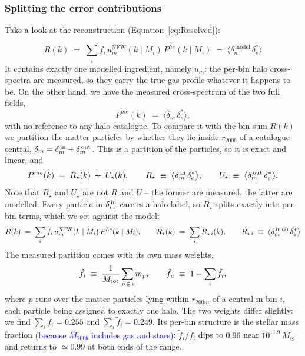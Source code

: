 \documentclass{article}
\begin{document}
\subsubsection{Splitting the error contributions}


Take a look at the reconstruction (Equation~\ref{eq:Resolved}):

\begin{equation}
    R(k) \; = \; \sum_i f_i \, u_m^\mathrm{NFW}(k \mid M_i) \, P^{he}(k \mid M_i) \; = \; \langle \delta_m^\mathrm{\,model} \, \delta_e^*\rangle
\end{equation}
It contains exactly one modelled ingredient, namely $u_m$: the per-bin halo cross-spectra are measured, so
they carry the true gas profile whatever it happens to be. On the other hand, we have the measured cross-spectrum of the two full fields,
\begin{equation}
  P^{me}(k) \;=\; \big\langle \delta_m\, \delta_e^* \big\rangle ,
\end{equation}
with no reference to any halo catalogue. To compare it with the bin sum
$R(k)$ we partition the matter
particles by whether they lie inside $r_{200b}$ of a catalogue central,
$\delta_m = \delta_m^{\,\rm in} + \delta_m^{\,\rm out}$. This is a partition of the
particles, so it is exact and linear, and
\begin{equation}
  P^{me}(k) \;=\; R_\star(k) \;+\; U_\star(k), \qquad
  R_\star \;\equiv\; \big\langle \delta_m^{\,\rm in} \, \delta_e^* \big\rangle, \qquad
  U_\star \;\equiv\; \big\langle \delta_m^{\,\rm out} \, \delta_e^* \big\rangle .
  \label{eq:T_split}
\end{equation}
Note that $R_\star$ and $U_\star$ are not $R$ and $U$ -- the former are measured, the latter are modelled. Every particle in $\delta_m^{\,\rm in}$ carries a halo label, so $R_\star$ splits exactly into per-bin terms, which we set against the model:
\begin{equation} \label{R_Rstar}
R(k) \; = \; \sum_i f_i \, u_m^\mathrm{NFW}(k \mid M_i) \, P^{he}(k \mid M_i), \qquad R_\star(k) \; = \; \sum_i R_{\star\,i}(k), \qquad R_{\star\,i} \;\equiv\; \big\langle \delta_m^{\,{\rm in}\,(i)} \, \delta_e^* \big\rangle
\end{equation}
The measured partition comes with its own mass weights,
\begin{equation}
    \tilde f_i \;\equiv\; \frac{1}{M_{\rm tot}}\sum_{p\,\in\,i} m_p,
  \qquad
  \tilde f_u \;\equiv\; 1-\sum_i \tilde f_i,
  \label{eq:ftilde}
\end{equation}
where $p$ runs over the matter particles lying within $r_{200m}$ of a central
in bin $i$, each particle being assigned to exactly one halo. The two weights
differ slightly: we find
$\sum_i f_i = 0.255$ and $\sum_i \tilde f_i = 0.249$. Its per-bin
structure is the stellar mass fraction \textcolor{blue}{(because $M_{200b}$ includes gas and stars)}: $\tilde f_i/f_i$ dips to $0.96$ near
$10^{11.9}\,M_\odot$ and returns to $\simeq0.99$ at both ends of the range.
\end{document}
